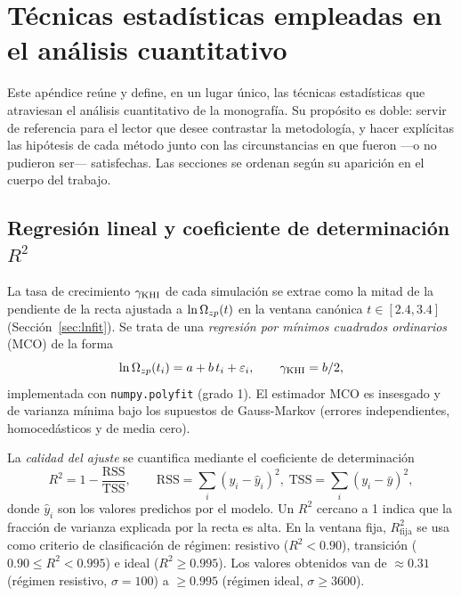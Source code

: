 \section{Técnicas estadísticas empleadas en el análisis cuantitativo}
\label{ap:estadistica}

\primerparrafo Este apéndice reúne y define, en un lugar único, las técnicas estadísticas que atraviesan el análisis cuantitativo de la monografía. Su propósito es doble: servir de referencia para el lector que desee contrastar la metodología, y hacer explícitas las hipótesis de cada método junto con las circunstancias en que fueron —o no pudieron ser— satisfechas. Las secciones se ordenan según su aparición en el cuerpo del trabajo.

\subsection{Regresión lineal y coeficiente de determinación \texorpdfstring{$R^2$}{R²}}
\label{ap:est:reglineal}

\primerparrafo La tasa de crecimiento $\gamma_{\mathrm{KHI}}$ de cada simulación se extrae como la mitad de la pendiente de la recta ajustada a $\ln\Omega_{zp}(t)$ en la ventana canónica $t\in[2.4,3.4]$ (Sección~\ref{sec:lnfit}). Se trata de una \emph{regresión por mínimos cuadrados ordinarios} (MCO) de la forma
\begin{equation}
    \ln\Omega_{zp}(t_i) = a + b\,t_i + \varepsilon_i,
    \qquad \gamma_{\mathrm{KHI}} = b/2,
\end{equation}
implementada con \texttt{numpy.polyfit} (grado 1). El estimador MCO es insesgado y de varianza mínima bajo los supuestos de Gauss-Markov (errores independientes, homocedásticos y de media cero).

\primerparrafo La \emph{calidad del ajuste} se cuantifica mediante el coeficiente de determinación
\begin{equation}
    R^2 = 1 - \frac{\mathrm{RSS}}{\mathrm{TSS}},
    \qquad
    \mathrm{RSS} = \sum_i(y_i - \hat y_i)^2,\;
    \mathrm{TSS} = \sum_i(y_i - \bar y)^2,
\end{equation}
donde $\hat y_i$ son los valores predichos por el modelo. Un $R^2$ cercano a 1 indica que la fracción de varianza explicada por la recta es alta. En la ventana fija, $R^2_{\mathrm{fija}}$ se usa como criterio de clasificación de régimen: resistivo ($R^2<0.90$), transición ($0.90\le R^2<0.995$) e ideal ($R^2\ge0.995$). Los valores obtenidos van de $\approx0.31$ (régimen resistivo, $\sigma=100$) a $\ge0.995$ (régimen ideal, $\sigma\ge3600$).


